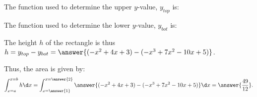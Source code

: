 \documentclass{ximera}
\begin{document}
\begin{exercise}
\begin{exercise}
The function used to determine the upper $y$-value, $y_{top}$ is:
\begin{multipleChoice}
\end{multipleChoice}

The function used to determine the lower $y$-value, $y_{bot}$ is:
\begin{multipleChoice}
\end{multipleChoice}

The height $h$ of the rectangle is thus $h=y_{top}-y_{bot} = \answer{( -x^2+4x+3)-(-x^3+7x^2-10x+5)}$.
\end{exercise}

\begin{exercise}
Thus, the area is given by:
  \[
 \int_{x=a}^{x=b} h \d x =  \int_{x=\answer{1}}^{x=\answer{2}} \answer{( -x^2+4x+3)-(-x^3+7x^2-10x+5) } \d x = \answer{\frac{49}{12}}.
  \]
\end{exercise}

\end{exercise}
\end{document}
